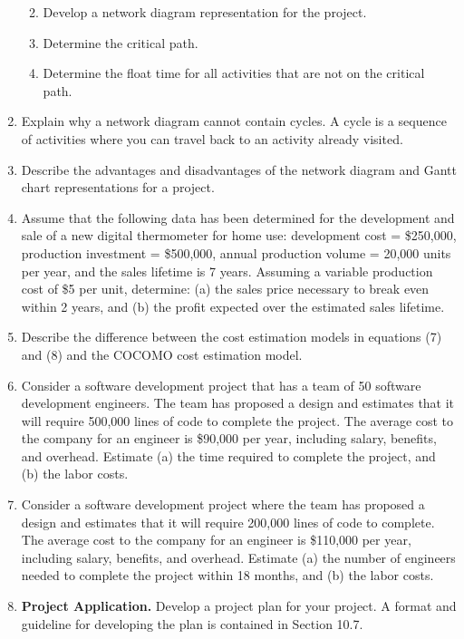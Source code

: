 \begin{enumerate}
\begin{enumerate}
\def\labelenumi{\alph{enumi})}
\item
  Develop a network diagram representation for the project.
\item
  Determine the critical path.
\item
  Determine the float time for all activities that are not on the
  critical path.
\end{enumerate}


  \item
    Explain why a network diagram cannot contain cycles. A cycle is a
    sequence of activities where you can travel back to an activity
    already visited.
  \item
    Describe the advantages and disadvantages of the network diagram and
    Gantt chart representations for a project.
  \item
    Assume that the following data has been determined for the
    development and sale of a new digital thermometer for home use:
    development cost = \$250,000, production investment = \$500,000,
    annual production volume = 20,000 units per year, and the sales
    lifetime is 7 years. Assuming a variable production cost of \$5 per
    unit, determine: (a) the sales price necessary to break even within
    2 years, and (b) the profit expected over the estimated sales
    lifetime.
  \item
    Describe the difference between the cost estimation models in
    equations (7) and (8) and the COCOMO cost estimation model.
  \item
    Consider a software development project that has a team of 50
    software development engineers. The team has proposed a design and
    estimates that it will require 500,000 lines of code to complete the
    project. The average cost to the company for an engineer is \$90,000
    per year, including salary, benefits, and overhead. Estimate (a) the
    time required to complete the project, and (b) the labor costs.
  \item
    Consider a software development project where the team has proposed
    a design and estimates that it will require 200,000 lines of code to
    complete. The average cost to the company for an engineer is
    \$110,000 per year, including salary, benefits, and overhead.
    Estimate (a) the number of engineers needed to complete the project
    within 18 months, and (b) the labor costs.
  \item
    \textbf{Project Application.} Develop a project plan for your
    project. A format and guideline for developing the plan is contained
    in Section 10.7.

\end{enumerate}
